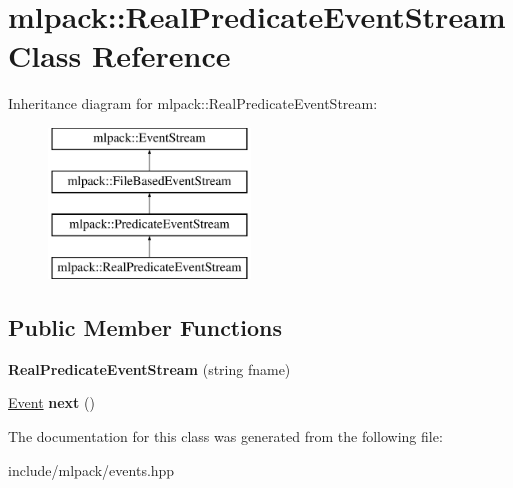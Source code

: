 \hypertarget{classmlpack_1_1_real_predicate_event_stream}{
\section{mlpack::RealPredicateEventStream Class Reference}
\label{classmlpack_1_1_real_predicate_event_stream}
}
Inheritance diagram for mlpack::RealPredicateEventStream:\begin{figure}[H]
\begin{center}
\leavevmode
\includegraphics[height=4.000000cm]{classmlpack_1_1_real_predicate_event_stream}
\end{center}
\end{figure}
\subsection*{Public Member Functions}
\begin{DoxyCompactItemize}
\item 
\hypertarget{classmlpack_1_1_real_predicate_event_stream_a11fa52e766139624bd415f81bcd0a0b9}{
{\bfseries RealPredicateEventStream} (string fname)}
\label{classmlpack_1_1_real_predicate_event_stream_a11fa52e766139624bd415f81bcd0a0b9}

\item 
\hypertarget{classmlpack_1_1_real_predicate_event_stream_aa2677da8e06cfe3d0c60aaf82eaf9cca}{
\hyperlink{structmlpack_1_1_event}{Event} {\bfseries next} ()}
\label{classmlpack_1_1_real_predicate_event_stream_aa2677da8e06cfe3d0c60aaf82eaf9cca}

\end{DoxyCompactItemize}


The documentation for this class was generated from the following file:\begin{DoxyCompactItemize}
\item 
include/mlpack/events.hpp\end{DoxyCompactItemize}
